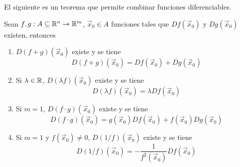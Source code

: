 El siguiente es un teorema que permite combinar funciones diferenciables.

\begin{teorema} 
Sean $f,g:A\subseteq\mathbb{R}^n\to\mathbb{R}^m$, $\vec{x}_0\in A$ funciones tales que $Df(\vec{x}_0)$ y $Dg(\vec{x}_0)$ existen, entonces
\begin{enumerate}
\item $D(f+g)(\vec{x}_0)$ existe y se tiene
\begin{equation}\label{diferencial-1}
D(f+g)(\vec{x}_0) = Df(\vec{x}_0) + Dg(\vec{x}_0)
\end{equation}

\item Si $\lambda \in \mathbb{R}$, $D(\lambda f)(\vec{x}_0)$ existe y se tiene
\begin{equation}\label{diferencial-2}
D(\lambda f)(\vec{x}_0) = \lambda Df(\vec{x}_0)
\end{equation} 

\item Si $m=1$, $D(f\cdot g)(\vec{x}_0)$ existe y se tiene
\begin{equation}\label{diferencial-3}
D(f\cdot g)(\vec{x}_0) = g(\vec{x}_0) Df(\vec{x}_0) + f(\vec{x}_0) Dg(\vec{x}_0)
\end{equation} 

\item Si $m=1$ y $f(\vec{x}_0) \neq 0$, $D(1/f)(\vec{x}_0)$ existe y se tiene
\begin{equation}\label{diferencial-4}
D(1/f)(\vec{x}_0) = -\frac{1}{f^2(\vec{x}_0)}Df(\vec{x}_0)
\end{equation}
\end{enumerate}
\end{teorema}

